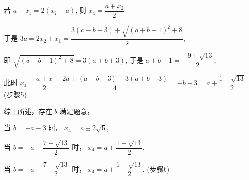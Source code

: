 \begin{solutions}
 若 $a-x_1 = 2(x_2-a)$, 则 $x_4 = \dfrac{a+x_2}{2}$

于是 $3a = 2x_2+x_1 = \dfrac{3(a-b-3)+\sqrt{(a+b-1)^2+8}}{2}$,

即 $\sqrt{(a-b-1)^2+8} = 3(a+b+3)$, 于是 $a+b-1 = \dfrac{-9+\sqrt{13}}{2}$,

此时 $x_4 = \dfrac{a+x}{2} = \dfrac{2a+(a-b-3)-3(a+b+3)}{4} = -b-3 = a+\dfrac{1-\sqrt{13}}{2}$ (步骤5)

综上所述，存在 $b$ 满足题意，

当 $b = -a-3$ 时， $x_4 = a \pm 2\sqrt{6}$,

当 $b = -a-\dfrac{7+\sqrt{13}}{2}$ 时， $x_4 = a+\dfrac{1+\sqrt{13}}{2}$,

当 $b = -a-\dfrac{7-\sqrt{13}}{2}$ 时， $x_4 = a+\dfrac{1-\sqrt{13}}{2}$. (步骤6)
\end{solutions}